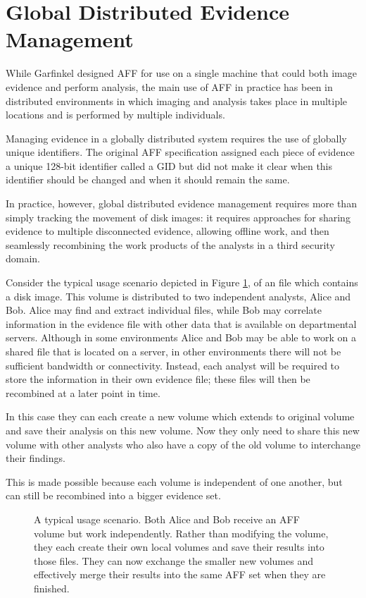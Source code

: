 \documentclass[10pt, conference]{IEEEtran}
\begin{document}
\section{Global Distributed Evidence Management}
While Garfinkel designed AFF for use on a single machine that could
both image evidence and perform analysis, the main use of AFF in
practice has been in distributed environments in which imaging and
analysis takes place in multiple locations and is performed by
multiple individuals.

Managing evidence in a globally distributed system requires the use of
globally unique identifiers. The original AFF specification assigned
each piece of evidence a unique 128-bit identifier called a GID but did
not make it clear when this identifier should be changed and when it
should remain the same. 

In practice, however, global distributed evidence management requires
more than simply tracking the movement of disk images: it requires
approaches for sharing evidence to multiple disconnected
evidence, allowing offline work, and then seamlessly recombining the
work products of the analysts in a third security domain.

Consider the typical usage scenario depicted in Figure \ref{usage}, of
an file which contains a disk image. This volume is distributed to two
independent analysts, Alice and Bob. Alice may find and extract
individual files, while Bob may correlate information in the evidence
file with other data that is available on departmental
servers. Although in some environments Alice and Bob may be able to
work on a shared file that is located on a server, in other
environments there will not be sufficient bandwidth or
connectivity. Instead, each analyst will be required to store the
information in their own evidence file; these files will then be
recombined at a later point in time.

In this case they can
each create a new volume which extends to original volume and save
their analysis on this new volume. Now they only need to share this
new volume with other analysts who also have a copy of the old volume
to interchange their findings. 

This is made possible because each volume is independent of one
another, but can still be recombined into a bigger evidence set. 

\begin{figure}[tb]
  \begin{center}
  \mbox{\columnwidth {}}
  \caption{A typical usage scenario. Both Alice and Bob receive an AFF
  volume but work independently. Rather than modifying the volume,
  they each create their own local volumes and save their results into
  those files. They can now exchange the smaller new volumes and
  effectively merge their results into the same AFF set when they are finished.}
  \label{usage}
  \end{center}
\end{figure}
\end{document}
